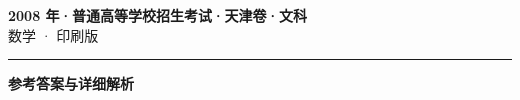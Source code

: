 \documentclass[zihao=5, a4paper]{ctexart}
\begin{document}
\begin{center}
  {\Large\bfseries 2008 年·普通高等学校招生考试·天津卷·文科}\\[4pt]
  {\large 数学 · 印刷版}
\end{center}
\medskip
{}

\par\bigskip\hrule\bigskip
{}
\begin{center}{\large\bfseries 参考答案与详细解析}\end{center}
\smallskip

\end{document}
